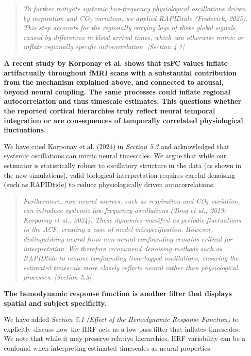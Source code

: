 \documentclass[docs/main.tex]{subfiles}
\newcommand{\reviewercomment}[1]{\vspace{0.3cm}\noindent\textbf{#1}\vspace{0.15cm}}
\newcommand{\manuscriptquote}[1]{\begin{quote}\textit{#1}\end{quote}}
\begin{document}
\manuscriptquote{To further mitigate systemic low-frequency physiological oscillations driven by respiration and CO$_2$ variation, we applied RAPIDtide (Frederick, 2025). This step accounts for the regionally varying lags of these global signals, caused by differences in blood arrival times, which can otherwise mimic or inflate regionally specific autocorrelation. [Section 4.1]}

\reviewercomment{A recent study by Korponay et al. shows that rsFC values inflate artifactually throughout fMRI scans with a substantial contribution from the mechanism explained above, and connected to arousal, beyond neural coupling. The same processes could inflate regional autocorrelation and thus timescale estimates. This questions whether the reported cortical hierarchies truly reflect neural temporal integration or are consequences of temporally correlated physiological fluctuations.}

We have cited Korponay et al. (2024) in \textit{Section 5.3} and acknowledged that systemic oscillations can mimic neural timescales. We argue that while our estimator is statistically robust to oscillatory structure in the data (as shown in the new simulations), valid biological interpretation requires careful denoising (such as RAPIDtide) to reduce physiologically driven autocorrelations.

\manuscriptquote{Furthermore, non-neural sources, such as respiration and CO$_2$ variation, can introduce systemic low-frequency oscillations (Tong et al., 2019; Korponay et al., 2024). These dynamics manifest as periodic fluctuations in the ACF, creating a case of model misspecification. However, distinguishing neural from non-neural confounding remains critical for interpretation. We therefore recommend denoising methods such as RAPIDtide to remove confounding time-lagged oscillations, ensuring the estimated timescale more closely reflects neural rather than physiological processes. [Section 5.3]}

\reviewercomment{The hemodynamic response function is another filter that displays spatial and subject specificity.}

We have added \textit{Section 5.1 (Effect of the Hemodynamic Response Function)} to explicitly discuss how the HRF acts as a low-pass filter that inflates timescales. We note that while it may preserve relative hierarchies, HRF variability can be a confound when interpreting estimated timescales as neural properties.
\end{document}
